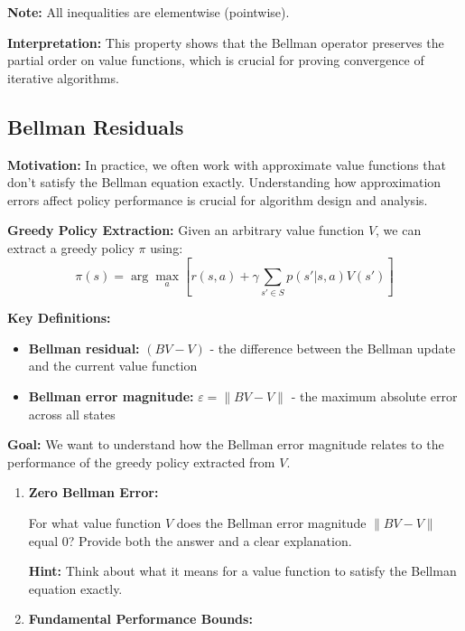 \documentclass[12pt]{article}
\begin{document}
{{\begin{enumerate}
    \textbf{Note:} All inequalities are elementwise (pointwise).
    
    \textbf{Interpretation:} This property shows that the Bellman operator preserves the partial order on value functions, which is crucial for proving convergence of iterative algorithms.
\end{enumerate}

\subsection{Bellman Residuals} 
\label{subsec:bellman_residuals}

\textbf{Motivation:} In practice, we often work with approximate value functions that don't satisfy the Bellman equation exactly. Understanding how approximation errors affect policy performance is crucial for algorithm design and analysis.

\textbf{Greedy Policy Extraction:} Given an arbitrary value function \( V \), we can extract a greedy policy \( \pi \) using:
\begin{equation}
\pi(s) = \arg\max_a \left[ r(s, a) + \gamma \sum_{s' \in S} p(s'|s, a)V(s') \right]
\end{equation}

\textbf{Key Definitions:}
\begin{itemize}
    \item \textbf{Bellman residual:} \( (BV - V) \) - the difference between the Bellman update and the current value function
    \item \textbf{Bellman error magnitude:} \( \varepsilon = \|BV - V\| \) - the maximum absolute error across all states
\end{itemize}

\textbf{Goal:} We want to understand how the Bellman error magnitude relates to the performance of the greedy policy extracted from \( V \).

\begin{enumerate}[resume*]
    \item \textbf{Zero Bellman Error:}
    
    For what value function \( V \) does the Bellman error magnitude \( \|BV - V\| \) equal 0? Provide both the answer and a clear explanation.
    
    \textbf{Hint:} Think about what it means for a value function to satisfy the Bellman equation exactly.
    
    \item \textbf{Fundamental Performance Bounds:}
    

\end{enumerate}}}
\end{document}
